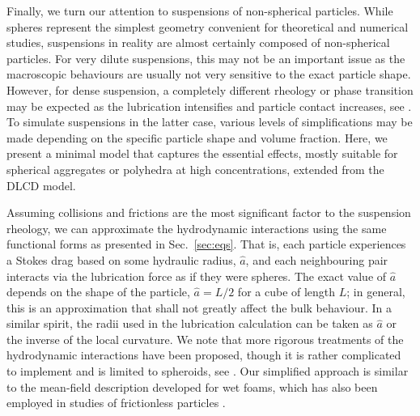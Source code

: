 Finally, we turn our attention to suspensions of non-spherical particles. While spheres represent the simplest geometry convenient for theoretical and numerical studies, suspensions in reality are almost certainly composed of non-spherical particles. For very dilute suspensions, this may not be an important issue as the macroscopic behaviours are usually not very sensitive to the exact particle shape. However, for dense suspension, a completely different rheology or phase transition may be expected as the lubrication intensifies and particle contact increases, see \eg \cite{Damasceno453, Royer_etal_2015, trulsson_2018}. To simulate suspensions in the latter case, various levels of simplifications may be made depending on the specific particle shape and volume fraction. Here, we present a minimal model that captures the essential effects, mostly suitable for spherical aggregates or polyhedra at high concentrations, extended from the DLCD model.

Assuming collisions and frictions are the most significant factor to the suspension rheology, we can approximate the hydrodynamic interactions using the same functional forms as presented in Sec.\ \ref{sec:eqs}. That is, each particle experiences a Stokes drag based on some hydraulic radius, $\hat{a}$, and each neighbouring pair interacts via the lubrication force as if they were spheres. The exact value of $\hat{a}$ depends on the shape of the particle, \eg $\hat{a}=L/2$ for a cube of length $L$; in general, this is an approximation that shall not greatly affect the bulk behaviour. In a similar spirit, the radii used in the lubrication calculation can be taken as $\hat{a}$ or the inverse of the local curvature. We note that more rigorous treatments of the hydrodynamic interactions have been proposed, though it is rather complicated to implement and is limited to spheroids, see \eg \cite{claeys_brady_1993}. Our simplified approach is similar to the mean-field description developed for wet foams, which has also been employed in studies of frictionless particles \citep{Durian_1997PRE, Marschall_etal_2019}.

